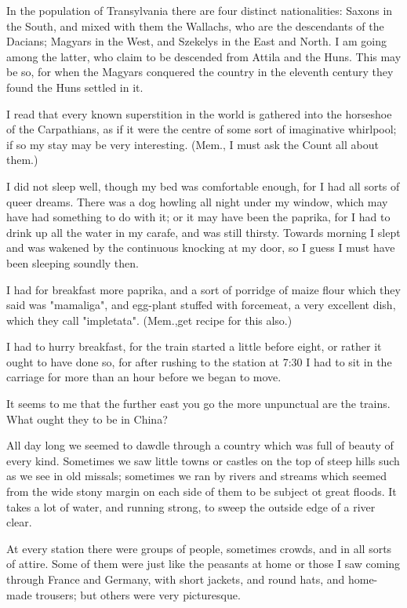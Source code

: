 In the population of Transylvania there are four distinct nationalities: Saxons in the South, and mixed with them the Wallachs, who are the descendants of the Dacians; Magyars in the West, and Szekelys in the East and North. I am going among the latter, who claim to be descended from Attila and the Huns. This may be so, for when the Magyars conquered the country in the eleventh century they found the Huns settled in it. 

I read that every known superstition in the world is gathered into the horseshoe of the Carpathians, as if it were the centre of some sort of imaginative whirlpool; if so my stay may be very interesting. (Mem., I must ask the Count all about them.) 

I did not sleep well, though my bed was comfortable enough, for I had all sorts of queer dreams. There was a dog howling all night under my window, which may have had something to do with it; or it may have been the paprika, for I had to drink up all the water in my carafe, and was still thirsty. Towards morning I slept and was wakened by the continuous knocking at my door, so I guess I must have been sleeping soundly then. 

I had for breakfast more paprika, and a sort of porridge of maize flour which they said was "mamaliga", and egg-plant stuffed with forcemeat, a very excellent dish, which they call "impletata". (Mem.,get recipe for this also.) 

I had to hurry breakfast, for the train started a little before eight, or rather it ought to have done so, for after rushing to the station at 7:30 I had to sit in the carriage for more than an hour before we began to move. 

It seems to me that the further east you go the more unpunctual are the trains. What ought they to be in China? 

All day long we seemed to dawdle through a country which was full of beauty of every kind. Sometimes we saw little towns or castles on the top of steep hills such as we see in old missals; sometimes we ran by rivers and streams which seemed from the wide stony margin on each side of them to be subject ot great floods. It takes a lot of water, and running strong, to sweep the outside edge of a river clear. 

At every station there were groups of people, sometimes crowds, and in all sorts of attire. Some of them were just like the peasants at home or those I saw coming through France and Germany, with short jackets, and round hats, and home-made trousers; but others were very picturesque. 

